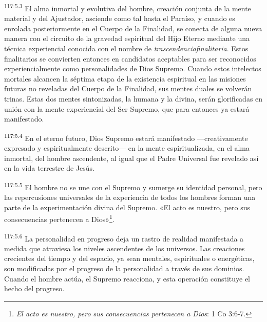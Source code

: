 \par
\textsuperscript{117:5.3} El alma inmortal y evolutiva del hombre, creación conjunta de la mente material y del Ajustador, asciende como tal hasta el Paraíso, y cuando es enrolada posteriormente en el Cuerpo de la Finalidad, se conecta de alguna nueva manera con el circuito de la gravedad espiritual del Hijo Eterno mediante una técnica experiencial conocida con el nombre de \textit{trascendenciafinalitaria}. Estos finalitarios se convierten entonces en candidatos aceptables para ser reconocidos experiencialmente como personalidades de Dios Supremo. Cuando estos intelectos mortales alcancen la séptima etapa de la existencia espiritual en las misiones futuras no reveladas del Cuerpo de la Finalidad, sus mentes duales se volverán trinas. Estas dos mentes sintonizadas, la humana y la divina, serán glorificadas en unión con la mente experiencial del Ser Supremo, que para entonces ya estará manifestado.

\par
\textsuperscript{117:5.4} En el eterno futuro, Dios Supremo estará manifestado ---creativamente expresado y espiritualmente descrito--- en la mente espiritualizada, en el alma inmortal, del hombre ascendente, al igual que el Padre Universal fue revelado así en la vida terrestre de Jesús.

\par
\textsuperscript{117:5.5} El hombre no se une con el Supremo y sumerge su identidad personal, pero las repercusiones universales de la experiencia de todos los hombres forman una parte de la experimentación divina del Supremo. «El acto es nuestro, pero sus consecuencias pertenecen a Dios»\footnote{\textit{El acto es nuestro, pero sus consecuencias pertenecen a Dios}: 1 Co 3:6-7.}.

\par
\textsuperscript{117:5.6} La personalidad en progreso deja un rastro de realidad manifestada a medida que atraviesa los niveles ascendentes de los universos. Las creaciones crecientes del tiempo y del espacio, ya sean mentales, espirituales o energéticas, son modificadas por el progreso de la personalidad a través de sus dominios. Cuando el hombre actúa, el Supremo reacciona, y esta operación constituye el hecho del progreso.

